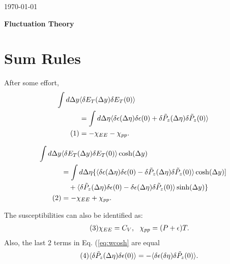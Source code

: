 \documentclass[12pt]{article}
\numberwithin{equation}{section}
\numberwithin{figure}{section}
\newcommand\eqnumber{\addtocounter{equation}{1}\tag{\theequation}}
\begin{document}
\today\\

\centerline{\bf\Large Fluctuation Theory}

\section{Sum Rules}
After some effort,
\begin{align*}
\int d\Delta y&\langle \delta E_T(\Delta y)\delta E_T(0)\rangle\\
&=\int d\Delta\eta\langle \delta\epsilon(\Delta\eta)\delta\epsilon(0)+\delta\tilde{P}_z(\Delta\eta)\delta\tilde{P}_z(0)\rangle\\
\eqnumber\label{eq:nocosh}
&=-\chi_{EE}-\chi_{pp}.
\end{align*}


\begin{align*}
\int d\Delta y &\langle \delta E_T(\Delta y)\delta E_T(0)\rangle\cosh(\Delta y)\\
&=\int d\Delta\eta\large\{\langle \delta\epsilon(\Delta\eta)\delta\epsilon(0)-\delta\tilde{P}_z(\Delta\eta)\delta\tilde{P}_z(0)\rangle\cosh(\Delta y)]\\
&~~~+\langle \delta\tilde{P}_z(\Delta\eta)\delta\epsilon(0)-\delta\epsilon(\Delta\eta)\delta\tilde{P}_z(0)\rangle\sinh(\Delta y)\large\}\\
\eqnumber\label{eq:wcosh}
&=-\chi_{EE}+\chi_{pp}.
\end{align*}

The susceptibilities can also be identified as:
\begin{align*}\eqnumber
\chi_{EE}=C_V,~~\chi_{pp}=(P+\epsilon)T.
\end{align*}
Also, the last 2 terms in Eq. (\ref{eq:wcosh} are equal
\begin{align*}\eqnumber
\langle\delta\tilde{P}_z(\Delta\eta)\delta\epsilon(0)\rangle=
-\langle\delta\epsilon(\delta\eta)\delta\tilde{P}_z(0)\rangle.
\end{align*}
\end{document}
